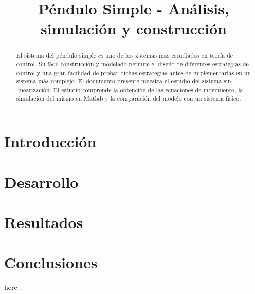 \documentclass[conference]{IEEEtran}
\begin{document}
\title{
Péndulo Simple - Análisis, simulación y construcción\\
}


\author{
}

\maketitle

\begin{abstract}

El sistema del péndulo simple es uno de los sistemas más estudiados
en teoría de control. 
Su fácil construcción y modelado permite el diseño de diferentes estrategias
de control y una gran facilidad de probar dichas estrategias antes de 
implementarlas en un sistema más complejo.
El documento presente muestra el estudio del sistema sin linearización.
El estudio comprende la obtención de las ecuaciones de movimiento,
la simulación del mismo en Matlab y la comparación del modelo con
un sistema físico.


\end{abstract}


\section{Introducción}


\section{Desarrollo}


\section{Resultados}


\section{Conclusiones}


here \cite{susskind}.



\end{document}
